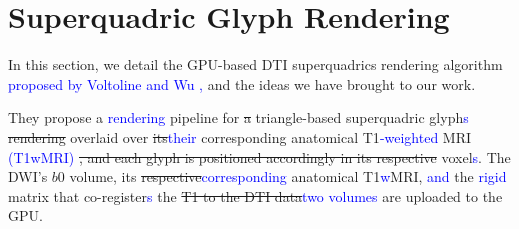 \documentclass[twoside,twocolumn,10pt]{article}
\begin{document}





\section{Superquadric Glyph Rendering}
\label{sec:superquadric_rendering}


In this section, we detail the GPU-based DTI superquadrics rendering algorithm  \textcolor{blue}{proposed by Voltoline and Wu \cite{voltoline2021},} and the ideas we have brought to our work.

They propose a \textcolor{blue}{rendering} pipeline for \sout{a} triangle-based superquadric glyph\textcolor{blue}{s} \sout{rendering} overlaid over \sout{its}\textcolor{blue}{their} corresponding anatomical T1\textcolor{blue}{-weighted} MRI \textcolor{blue}{(T1wMRI)} \sout{, and each glyph is positioned accordingly in its respective} voxel\textcolor{blue}{s}. The DWI's $b0$ volume, its \sout{respective}\textcolor{blue}{corresponding} anatomical T1\textcolor{blue}{w}MRI, \textcolor{blue}{and} the \textcolor{blue}{rigid} matrix that co-register\textcolor{blue}{s} the \sout{T1 to the DTI data}\textcolor{blue}{two volumes} are uploaded to the GPU. 


\end{document}

